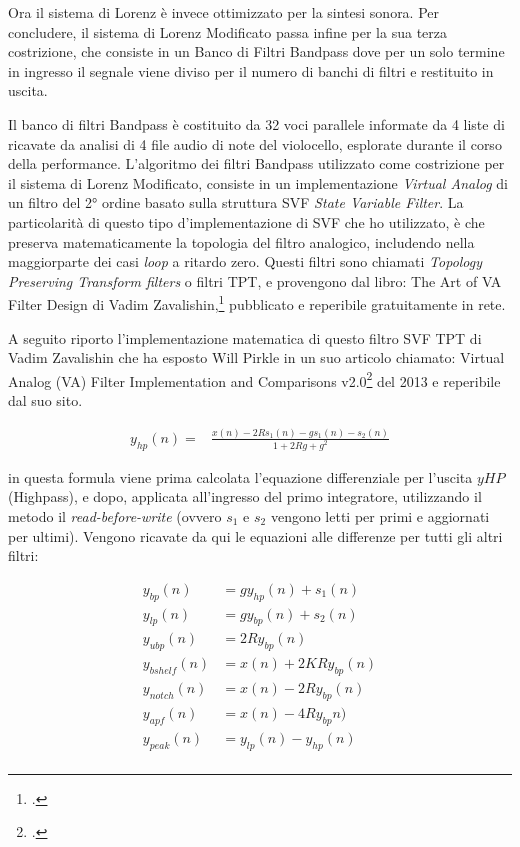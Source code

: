 Ora il sistema di Lorenz è invece ottimizzato per la sintesi sonora.
Per concludere, il sistema di Lorenz Modificato passa infine per la sua terza costrizione,
che consiste in un Banco di Filtri Bandpass dove per un solo termine in ingresso 
il segnale viene diviso per il numero di banchi di filtri e restituito in uscita. 

Il banco di filtri Bandpass è costituito da 32 voci parallele informate da 
4 liste di ricavate da analisi di 4 file audio di note del violocello,
esplorate durante il corso della performance.
L'algoritmo dei filtri Bandpass utilizzato come costrizione per il sistema
di Lorenz Modificato, consiste in un implementazione \textit{Virtual Analog} 
di un filtro del 2° ordine basato sulla struttura SVF \textit{State Variable Filter}.
La particolarità di questo tipo d'implementazione di SVF che ho utilizzato,
è che preserva matematicamente la topologia del filtro analogico,
includendo nella maggiorparte dei casi \textit{loop} a ritardo zero.
Questi filtri sono chiamati \textit{Topology Preserving Transform filters} o filtri TPT,
e provengono dal libro: The Art of VA Filter Design di Vadim Zavalishin,\footcite{Zavalishin_VA_filter_design}
pubblicato e reperibile gratuitamente in rete. 

A seguito riporto l'implementazione matematica di questo filtro SVF TPT di Vadim Zavalishin
che ha esposto Will Pirkle in un suo articolo chiamato: 
Virtual Analog (VA) Filter Implementation and Comparisons v2.0\footcite{Pirkle_VA_filter_design}
del 2013 e reperibile dal suo sito.

\begin{align*}
    y_{hp}(n) = & \frac{x(n)- 2Rs_{1}(n) - gs_{1}(n) - s_{2}(n)}
    {1 + 2Rg + g^{2}}
\end{align*}

in questa formula viene prima calcolata l'equazione 
differenziale per l'uscita \( yHP \) (Highpass),
e dopo, applicata all'ingresso del primo integratore, 
utilizzando il metodo il \textit{read-before-write}
(ovvero \( s_{1} \) e \( s_{2} \) vengono letti per primi e aggiornati per ultimi). 
Vengono ricavate da qui le equazioni alle differenze per tutti gli altri filtri:

\begin{align*}
{y_{bp}(n)}& =  gy_{hp}(n) + s_{1}(n) \\
{y_{lp}(n)}& =  gy_{bp}(n) + s_{2}(n) \\
{y_{ubp}(n)}& =  2Ry_{bp}(n) \\
{y_{bshelf}(n)}& =  x(n) + 2KRy_{bp}(n) \\
{y_{notch}(n)}& =  x(n) - 2Ry_{bp}(n) \\
{y_{apf}(n)}& =  x(n) - 4Ry_{bp}n) \\
{y_{peak}(n)}& =  y_{lp}(n) - y_{hp}(n) \\
\end{align*}


